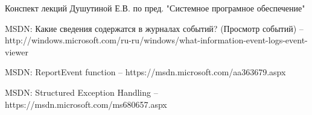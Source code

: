 \documentclass[a4paper, 12pt]{report}		%
\begin{document}
\newpage


\begin{thebibliography}{00}

Конспект лекций Душутиной Е.В. по пред. "Системное програмное обеспечение"

MSDN: Какие сведения содержатся в журналах событий? (Просмотр событий) -- http://windows.microsoft.com/ru-ru/windows/what-information-event-logs-event-viewer

MSDN: ReportEvent function -- https://msdn.microsoft.com/aa363679.aspx

MSDN: Structured Exception Handling -- https://msdn.microsoft.com/ms680657.aspx

\end{thebibliography}
\end{document}
